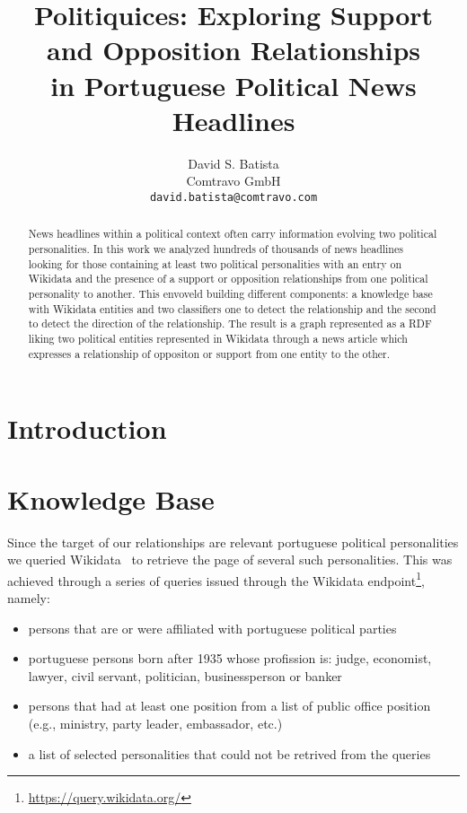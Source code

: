 \documentclass[11pt,a4paper]{article}
\title{Politiquices: Exploring Support and Opposition Relationships \\in Portuguese Political News Headlines}
\author{David S. Batista \\
  Comtravo GmbH \\
  \texttt{david.batista@comtravo.com}
}
\date{}
\begin{document}
\maketitle
\begin{abstract}
News headlines within a political context often carry information evolving two political personalities.
In this work we analyzed hundreds of thousands of news headlines looking for those containing at least 
two political personalities with an entry on Wikidata and the presence of a support or opposition relationships 
from one political personality to another. This envoveld building different components: a knowledge base with
Wikidata entities and two classifiers one to detect the relationship and the second to detect the direction of
the relationship. The result is a graph represented as a RDF liking two political entities represented in Wikidata
through a news article which expresses a relationship of oppositon or support from one entity to the other.
\end{abstract}


\section{Introduction}
\label{sec:intro}





\section{Knowledge Base}
\label{sec_kb}

Since the target of our relationships are relevant portuguese political personalities we queried
Wikidata~\cite{MKGGB2018} to retrieve the page of several such personalities. This was achieved through a series
of queries issued through the Wikidata endpoint\footnote{\url{https://query.wikidata.org/}}, namely:

\begin{itemize}  
\item persons that are or were affiliated with portuguese political parties
\item portuguese persons born after 1935 whose profission is: judge, economist, lawyer, civil servant, politician, businessperson or banker
\item persons that had at least one position from a list of public office position (e.g., ministry, party leader, embassador, etc.)
\item a list of selected personalities that could not be retrived from the queries
\end{itemize}  
\end{document}
